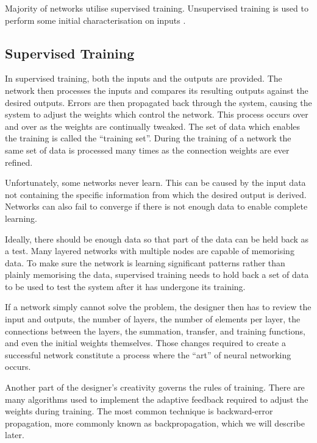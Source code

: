 Majority of networks utilise supervised training. Unsupervised training is used to perform some initial characterisation on inputs \cite{mostcommon}.

\vspace{10pt}

\subsection*{Supervised Training}

In supervised training, both the inputs and the outputs are provided. The network then processes the inputs and compares its resulting outputs against the desired outputs. Errors are then propagated back through the system, causing the system to adjust the weights which control the network. This process occurs over and over as the weights are continually tweaked. The set of data which enables the training is called the ``training set''. During the training of a network the same set of data is processed many times as the connection weights are ever refined.

Unfortunately, some networks never learn. This can be caused by the input data not containing the specific information from which the desired output is derived. Networks can also fail to converge if there is not enough data to enable complete learning. 

Ideally, there should be enough data so that part of the data can be held back as a test. Many layered networks with multiple nodes are capable of memorising data. To make sure the network is learning significant patterns rather than plainly memorising the data, supervised training needs to hold back a set of data to be used to test the system after it has undergone its training.

If a network simply cannot solve the problem, the designer then has to review the input and outputs, the number of layers, the number of elements per layer, the connections between the layers, the summation, transfer, and training functions, and even the initial weights themselves. Those changes required to create a successful network constitute a process where the ``art'' of neural networking occurs.

Another part of the designer's creativity governs the rules of training. There are many algorithms used to implement the adaptive feedback required to adjust the weights during training. The most common technique is backward-error propagation, more commonly known as backpropagation, which we will describe later.

